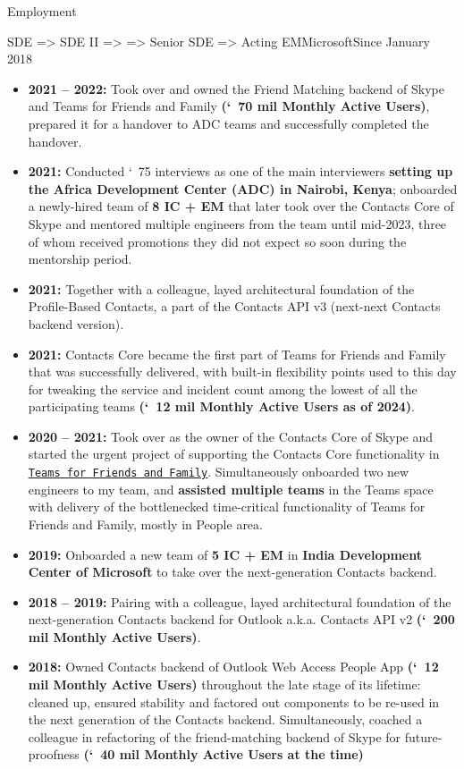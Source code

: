 \documentclass[calibri]{mcdowellcv}
\newcommand{\ultthref}[2]{\href{#1}{\underline{\texttt{#2}}}}
\begin{document}
\begin{cvsection}{Employment}
\begin{cvsubsection}[2]{SDE => SDE II => \linebreak => Senior SDE => Acting EM}{Microsoft}{Since January 2018}
\begin{itemize}
                                       \item \textbf{2021 -- 2022:} Took over and owned the Friend Matching backend of Skype and Teams for Friends and Family \textbf{(\char`~70 mil Monthly Active Users)}, prepared it for a handover to ADC teams and successfully completed the handover.
				\item \textbf{2021:} Conducted \char`~75 interviews as one of the main interviewers \textbf{setting up the Africa Development Center (ADC) in Nairobi, Kenya}; onboarded a newly-hired team of \textbf{8 IC + EM} that later took over the Contacts Core of Skype and mentored multiple engineers from the team until mid-2023, three of whom received promotions they did not expect so soon during the mentorship period.
				\item \textbf{2021:} Together with a colleague, layed architectural foundation of the Profile-Based Contacts, a part of the Contacts API v3 (next-next Contacts backend version).
                                       \item \textbf{2021:} Contacts Core became the first part of Teams for Friends and Family that was successfully delivered, with built-in flexibility points used to this day for tweaking the service and incident count among the lowest of all the participating teams \textbf{(\char`~12 mil Monthly Active Users as of 2024)}.
                                       \item \textbf{2020 -- 2021:} Took over as the owner of the Contacts Core of Skype and started the urgent project of supporting the Contacts Core functionality in \ultthref{https://www.microsoft.com/en-us/microsoft-teams/teams-for-home}{Teams for Friends and Family}. Simultaneously onboarded two new engineers to my team, and \textbf{assisted multiple teams} in the Teams space with delivery of the bottlenecked time-critical functionality of Teams for Friends and Family, mostly in People area.
                                       \item \textbf{2019:} Onboarded a new team of \textbf{5 IC + EM} in \textbf{India Development Center of Microsoft} to take over the next-generation Contacts backend.
                                       \item \textbf{2018 -- 2019:} Pairing with a colleague, layed architectural foundation of the next-generation Contacts backend for Outlook a.k.a. Contacts API v2 \textbf{(\char`~200 mil Monthly Active Users)}.
                                       \item \textbf{2018:} Owned Contacts backend of Outlook Web Access People App \textbf{(\char`~12 mil Monthly Active Users)} throughout the late stage of its lifetime: cleaned up, ensured stability and factored out components to be re-used in the next generation of the Contacts backend. Simultaneously, coached a colleague in refactoring of the friend-matching backend of Skype for future-proofness \textbf{(\char`~40 mil Monthly Active Users at the time)}

\end{itemize}
\end{cvsubsection}
\end{cvsection}
\end{document}
